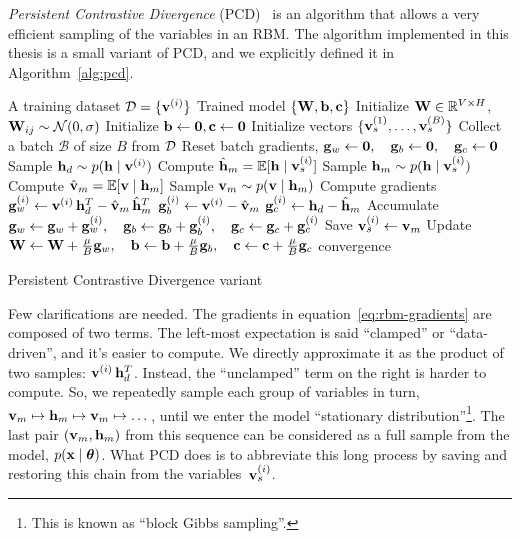 \emph{Persistent Contrastive Divergence}
(PCD)~\cite{bib:rbm-persistent-cd} is an algorithm that allows a very efficient sampling of the
variables in an RBM.  The algorithm implemented in this thesis is a small
variant of PCD, and we explicitly defined it in Algorithm~\ref{alg:pcd}.
\begin{algorithm}[thb]
	\centering
	\begin{algorithmic}[1]
		\Require A training dataset $\mathcal{D} = \{\mathbf{v}^{(i)}\}$
		\Ensure Trained model $\{\mathbf{W}, \mathbf{b}, \mathbf{c}\}$
		\State Initialize $\mathbf{W} \in \mathbb{R}^{V \times H}$,
			$\mathbf{W}_{ij} \sim \mathcal{N}(0,\sigma)$
		\State Initialize $\mathbf{b} \gets \mathbf{0}, \mathbf{c} \gets \mathbf{0}$
		\State Initialize vectors $\{\mathbf{v}_s^{(1)}, \dots, \mathbf{v}_s^{(B)}\}$
		\Repeat
			\State Collect a batch $\mathcal{B}$ of size $B$ from $\mathcal{D}$
			\State Reset batch gradients, $\mathbf{g}_w \gets \mathbf{0},
				\quad \mathbf{g}_b \gets \mathbf{0},
				\quad \mathbf{g}_c \gets \mathbf{0}$
				\State Sample $\mathbf{h}_d \sim p(\mathbf{h} \mid \mathbf{v}^{(i)})$
				\State Compute $\hat{\mathbf{h}}_m = \mathbb{E}[\mathbf{h} \mid \mathbf{v}_s^{(i)}]$
				\State Sample $\mathbf{h}_m \sim p(\mathbf{h} \mid \mathbf{v}_s^{(i)})$
				\State Compute $\hat{\mathbf{v}}_m = \mathbb{E}[\mathbf{v} \mid \mathbf{h}_m]$
				\State Sample $\mathbf{v}_m \sim p(\mathbf{v} \mid \mathbf{h}_m)$
				\State Compute gradients 
					\Statex[3] $\mathbf{g}_w^{(i)} \gets
						\mathbf{v}^{(i)}\, \mathbf{h}_d^T - \hat{\mathbf{v}}_m\, \hat{\mathbf{h}}_m^T$
					\Statex[3] $\mathbf{g}_b^{(i)} \gets \mathbf{v}^{(i)} - \hat{\mathbf{v}}_m$
					\Statex[3] $\mathbf{g}_c^{(i)} \gets \mathbf{h}_d - \hat{\mathbf{h}}_m$
				\State Accumulate $\mathbf{g}_w \gets \mathbf{g}_w + \mathbf{g}_w^{(i)},
					\quad \mathbf{g}_b \gets \mathbf{g}_b + \mathbf{g}_b^{(i)},
					\quad \mathbf{g}_c \gets \mathbf{g}_c + \mathbf{g}_c^{(i)}$
				\State Save $\mathbf{v}_s^{(i)} \gets \mathbf{v}_m$
			\EndFor
			\State Update $\mathbf{W} \gets \mathbf{W} + \frac{\mu}{B} \mathbf{g}_w,
				\quad \mathbf{b} \gets \mathbf{b} + \frac{\mu}{B} \mathbf{g}_b,
				\quad \mathbf{c} \gets \mathbf{c} + \frac{\mu}{B} \mathbf{g}_c$
		\Until convergence
	\end{algorithmic}
	\caption{Persistent Contrastive Divergence variant}
	\label{alg:pcd}
\end{algorithm}

Few clarifications are needed. The gradients in
equation~\ref{eq:rbm-gradients} are composed of two terms. The left-most
expectation is said ``clamped'' or ``data-driven'', and it's easier to
compute. We directly approximate it as the product of two samples:
$\mathbf{v}^{(i)}\, \mathbf{h}_d^T$. Instead, the ``unclamped'' term on the right is
harder to compute. So, we repeatedly sample each group of variables in turn,
$\mathbf{v}_m \mapsto \mathbf{h}_m \mapsto \mathbf{v}_m \mapsto \dots$, until we enter the model
``stationary distribution''\footnote{This is known as ``block Gibbs
sampling''.}. The last pair $(\mathbf{v}_m, \mathbf{h}_m)$ from this sequence can be
considered as a full sample from the model, $p(\mathbf{x} \mid \bm{\theta})$. What PCD
does is to abbreviate this long process by saving and restoring this chain
from the variables~$\mathbf{v}_s^{(i)}$.

